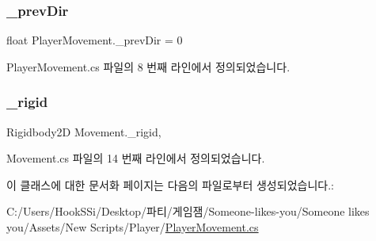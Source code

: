 \subsubsection{\texorpdfstring{\_prevDir}{\_prevDir}}
{\footnotesize\ttfamily float Player\+Movement.\+\_\+prev\+Dir = 0}



Player\+Movement.\+cs 파일의 8 번째 라인에서 정의되었습니다.

\mbox{\label{class_movement_a8b24a93b5f529e53c668ff81bde13c0d}} 
\subsubsection{\texorpdfstring{\_rigid}{\_rigid}}
{\footnotesize\ttfamily Rigidbody2D Movement.\+\_\+rigid\hspace{0.3cm}{\ttfamily [protected]}, {\ttfamily [inherited]}}



Movement.\+cs 파일의 14 번째 라인에서 정의되었습니다.



이 클래스에 대한 문서화 페이지는 다음의 파일로부터 생성되었습니다.\+:\begin{DoxyCompactItemize}
\item 
C\+:/\+Users/\+Hook\+S\+Si/\+Desktop/파티/게임잼/\+Someone-\/likes-\/you/\+Someone likes you/\+Assets/\+New Scripts/\+Player/\mbox{\hyperlink{_player_movement_8cs}{Player\+Movement.\+cs}}\end{DoxyCompactItemize}
